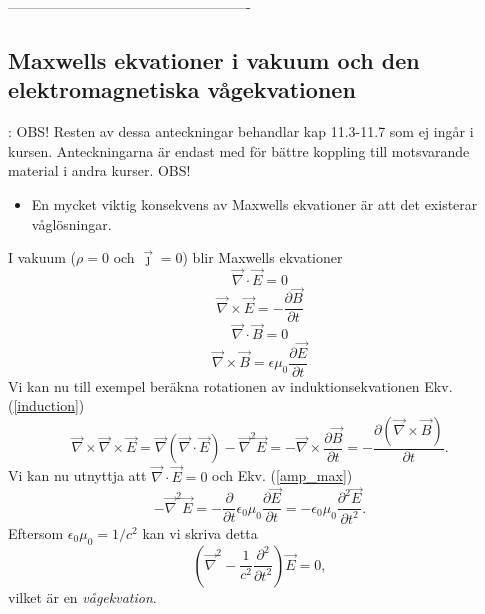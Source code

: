\documentclass[%
oneside,                 %
final,                   %
10pt]{article}
\newcommand{\longinlinecomment}[3]{{\color{red}{\bf #1}: #2}}
\begin{document}
----------------------------------------------------

\subsection{Maxwells ekvationer i vakuum och den elektromagnetiska vågekvationen}

\longinlinecomment{Comment 7}{ OBS! Resten av dessa anteckningar behandlar kap 11.3-11.7 som ej ingår i kursen. Anteckningarna är endast med för bättre koppling till motsvarande material i andra kurser. OBS! }{ OBS! Resten av dessa }

\begin{itemize}
\item En mycket viktig konsekvens av Maxwells ekvationer är att det existerar våglösningar.
\end{itemize}

\noindent
I vakuum ($\rho=0$ och $\vec{\jmath} = 0$) blir Maxwells ekvationer
\begin{equation}
  \vec{\nabla} \cdot \vec{E} = 0
\end{equation}
\begin{equation}
  \vec{\nabla} \times \vec{E} = - \frac{\partial \vec{B}}{\partial t}
\label{induction}
\end{equation}
\begin{equation}
  \vec{\nabla} \cdot \vec{B} = 0
\end{equation}
\begin{equation}
  \vec{\nabla} \times \vec{B} = \epsilon \mu_0 \frac{\partial \vec{E}}{\partial t}
\label{amp_max}
\end{equation}
Vi kan nu till exempel beräkna rotationen av induktionsekvationen Ekv. (\ref{induction})
\begin{equation}
  \vec{\nabla} \times \vec{\nabla} \times \vec{E} = \vec{\nabla} \left( \vec{\nabla} \cdot \vec{E}
\right) - \vec{\nabla}^2 \vec{E} = - \vec{\nabla} \times 
\frac{\partial \vec{B}}{\partial t} =
- \frac{\partial (\vec{\nabla} \times \vec{B})}{\partial t}.
\end{equation}
Vi kan nu utnyttja att $\vec{\nabla} \cdot \vec{E} =0$ och Ekv. (\ref{amp_max})
\begin{equation}
  - \vec{\nabla}^2 \vec{E} = - \frac{\partial}{\partial t} \epsilon_0 \mu_0
\frac{\partial \vec{E}}{\partial t} = 
- \epsilon_0 \mu_0 \frac{\partial^2 \vec{E}}{\partial t^2}.
\end{equation}
Eftersom $\epsilon_0 \mu_0 = 1/c^2$ kan vi skriva detta
\begin{equation}
  \left( \vec{\nabla}^2 - \frac{1}{c^2} \frac{\partial^2}{\partial t^2} \right) \vec{E} = 0,
\label{vaag}
\end{equation}
vilket är en \emph{vågekvation}. 
\end{document}
